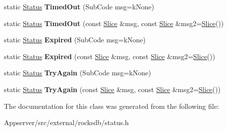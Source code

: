 \begin{DoxyCompactItemize}
\item 
static \hyperlink{classrocksdb_1_1Status}{Status} {\bfseries Timed\+Out} (Sub\+Code msg=k\+None)\hypertarget{classrocksdb_1_1Status_a35c568e76c206ce1b529de1d1e93b36d}{}\label{classrocksdb_1_1Status_a35c568e76c206ce1b529de1d1e93b36d}

\item 
static \hyperlink{classrocksdb_1_1Status}{Status} {\bfseries Timed\+Out} (const \hyperlink{classrocksdb_1_1Slice}{Slice} \&msg, const \hyperlink{classrocksdb_1_1Slice}{Slice} \&msg2=\hyperlink{classrocksdb_1_1Slice}{Slice}())\hypertarget{classrocksdb_1_1Status_a130325d800a3238a68622d94ba9f8945}{}\label{classrocksdb_1_1Status_a130325d800a3238a68622d94ba9f8945}

\item 
static \hyperlink{classrocksdb_1_1Status}{Status} {\bfseries Expired} (Sub\+Code msg=k\+None)\hypertarget{classrocksdb_1_1Status_ae5391df04f0e9deb8a670977f0e20143}{}\label{classrocksdb_1_1Status_ae5391df04f0e9deb8a670977f0e20143}

\item 
static \hyperlink{classrocksdb_1_1Status}{Status} {\bfseries Expired} (const \hyperlink{classrocksdb_1_1Slice}{Slice} \&msg, const \hyperlink{classrocksdb_1_1Slice}{Slice} \&msg2=\hyperlink{classrocksdb_1_1Slice}{Slice}())\hypertarget{classrocksdb_1_1Status_ab910e01b91c2cd40cb8d81fa1e0c6540}{}\label{classrocksdb_1_1Status_ab910e01b91c2cd40cb8d81fa1e0c6540}

\item 
static \hyperlink{classrocksdb_1_1Status}{Status} {\bfseries Try\+Again} (Sub\+Code msg=k\+None)\hypertarget{classrocksdb_1_1Status_a345bcbbff5c16346001c37ce021cb949}{}\label{classrocksdb_1_1Status_a345bcbbff5c16346001c37ce021cb949}

\item 
static \hyperlink{classrocksdb_1_1Status}{Status} {\bfseries Try\+Again} (const \hyperlink{classrocksdb_1_1Slice}{Slice} \&msg, const \hyperlink{classrocksdb_1_1Slice}{Slice} \&msg2=\hyperlink{classrocksdb_1_1Slice}{Slice}())\hypertarget{classrocksdb_1_1Status_a8f4dd7fa6e135ee369b518f7498bfddf}{}\label{classrocksdb_1_1Status_a8f4dd7fa6e135ee369b518f7498bfddf}

\end{DoxyCompactItemize}


The documentation for this class was generated from the following file\+:\begin{DoxyCompactItemize}
\item 
Appserver/src/external/rocksdb/status.\+h\end{DoxyCompactItemize}

